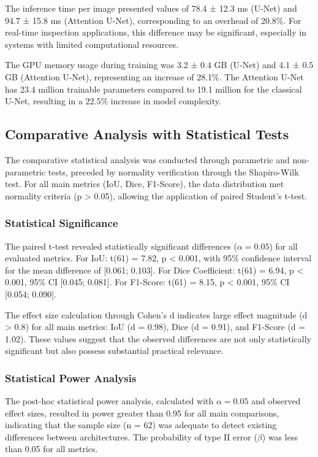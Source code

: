 \documentclass[Journal,letterpaper]{ascelike-new}
\begin{document}
The inference time per image presented values of 78.4 ± 12.3 ms (U-Net) and 94.7 ± 15.8 ms (Attention U-Net), corresponding to an overhead of 20.8\%. For real-time inspection applications, this difference may be significant, especially in systems with limited computational resources.

The GPU memory usage during training was 3.2 ± 0.4 GB (U-Net) and 4.1 ± 0.5 GB (Attention U-Net), representing an increase of 28.1\%. The Attention U-Net has 23.4 million trainable parameters compared to 19.1 million for the classical U-Net, resulting in a 22.5\% increase in model complexity.

\subsection{Comparative Analysis with Statistical Tests}
\label{subsec:comparative_analysis}

The comparative statistical analysis was conducted through parametric and non-parametric tests, preceded by normality verification through the Shapiro-Wilk test. For all main metrics (IoU, Dice, F1-Score), the data distribution met normality criteria (p > 0.05), allowing the application of paired Student's t-test.

\subsubsection{Statistical Significance}

The paired t-test revealed statistically significant differences ($\alpha = 0.05$) for all evaluated metrics. For IoU: t(61) = 7.82, p < 0.001, with 95\% confidence interval for the mean difference of [0.061; 0.103]. For Dice Coefficient: t(61) = 6.94, p < 0.001, 95\% CI [0.045; 0.081]. For F1-Score: t(61) = 8.15, p < 0.001, 95\% CI [0.054; 0.090].

The effect size calculation through Cohen's d indicates large effect magnitude (d > 0.8) for all main metrics: IoU (d = 0.98), Dice (d = 0.91), and F1-Score (d = 1.02). These values suggest that the observed differences are not only statistically significant but also possess substantial practical relevance.

\subsubsection{Statistical Power Analysis}

The post-hoc statistical power analysis, calculated with $\alpha = 0.05$ and observed effect sizes, resulted in power greater than 0.95 for all main comparisons, indicating that the sample size (n = 62) was adequate to detect existing differences between architectures. The probability of type II error ($\beta$) was less than 0.05 for all metrics.
\end{document}
